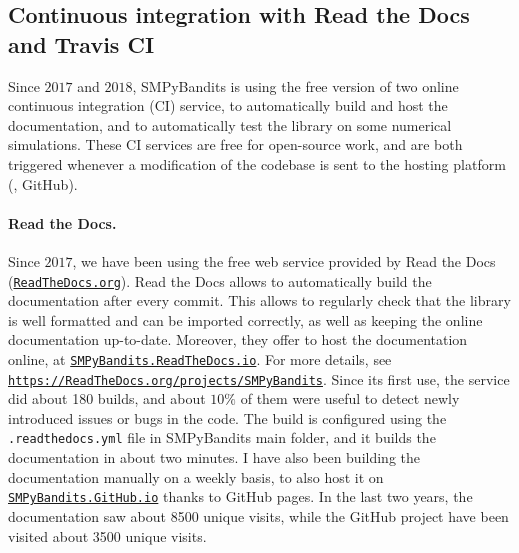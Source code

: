 \subsection{Continuous integration with Read the Docs and Travis CI}


Since $2017$ and $2018$, SMPyBandits is using the free version of two online continuous integration (CI) service, to automatically build and host the documentation, and to automatically test the library on some numerical simulations.
%
These CI services are free for open-source work, and are both triggered whenever a modification of the codebase is sent to the hosting platform (\ie, GitHub).

\paragraph{Read the Docs.}
Since $2017$, we have been using the free web service provided by Read the Docs (\href{https://readthedocs.org/}{\texttt{ReadTheDocs.org}}).
Read the Docs allows to automatically build the documentation after every commit. This allows to regularly check that the library is well formatted and can be imported correctly, as well as keeping the online documentation up-to-date.
Moreover, they offer to host the documentation online, at \href{https://smpybandits.rtfd.io/}{\texttt{SMPyBandits.ReadTheDocs.io}}.
For more details, see \href{https://readthedocs.org/projects/smpybandits/}{\texttt{https://ReadTheDocs.org/projects/SMPyBandits}}.
%
Since its first use, the service did about 180 builds, and about $10\%$ of them were useful to detect newly introduced issues or bugs in the code.
The build is configured using the \texttt{.readthedocs.yml} file in SMPyBandits main folder, and it builds the documentation in about two minutes.
I have also been building the documentation manually on a weekly basis, to also host it on \href{https://smpybandits.github.io/}{\texttt{SMPyBandits.GitHub.io}} thanks to GitHub pages.
In the last two years, the documentation saw about 8500 unique visits, while the GitHub project have been visited about 3500 unique visits.


